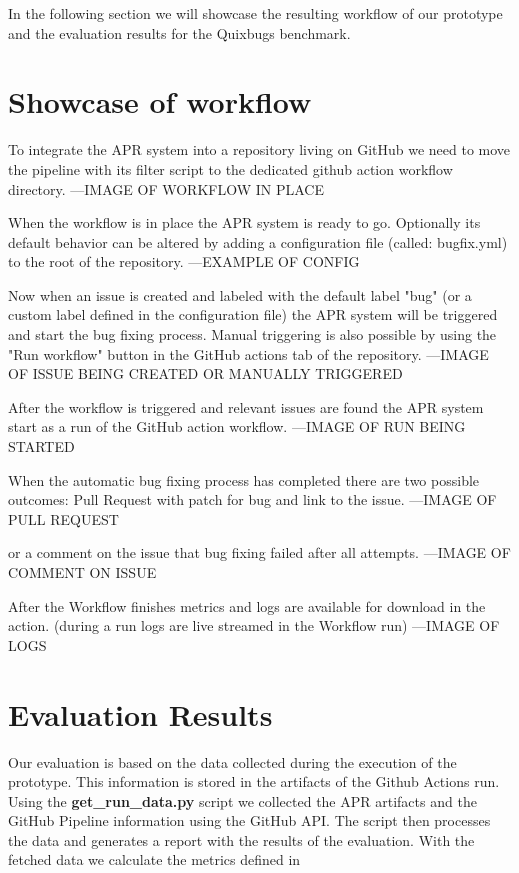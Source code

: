 In the following section we will showcase the resulting workflow of our prototype and the evaluation results for the Quixbugs benchmark.
\section{Showcase of workflow}
To integrate the APR system into a repository living on GitHub we need to move the pipeline with its filter script to the dedicated github action workflow directory.
---IMAGE OF WORKFLOW IN PLACE

When the workflow is in place the APR system is ready to go. Optionally its default behavior can be altered by adding a configuration file (called: bugfix.yml) to the root of the repository.
---EXAMPLE OF CONFIG

Now when an issue is created and labeled with the default label "bug" (or a custom label defined in the configuration file) the APR system will be triggered and start the bug fixing process. Manual triggering is also possible by using the "Run workflow" button in the GitHub actions tab of the repository.
---IMAGE OF ISSUE BEING CREATED OR MANUALLY TRIGGERED

After the workflow is triggered and relevant issues are found the APR system start as a run of the GitHub action workflow.
---IMAGE OF RUN BEING STARTED


When the automatic bug fixing process has completed there are two possible outcomes:
Pull Request with patch for bug and link to the issue.
---IMAGE OF PULL REQUEST

or a comment on the issue that bug fixing failed after all attempts.
---IMAGE OF COMMENT ON ISSUE

After the Workflow finishes metrics and logs are available for download in the action.
(during a run logs are live streamed in the Workflow run)
---IMAGE OF LOGS

\section{Evaluation Results}
Our evaluation is based on the data collected during the execution of the prototype. This information is stored in the artifacts of the Github Actions run. Using the \textbf{get\_run\_data.py} script we collected the APR artifacts and the GitHub Pipeline information using the GitHub API. The script then processes the data and generates a report with the results of the evaluation. With the fetched data we calculate the metrics defined in %

